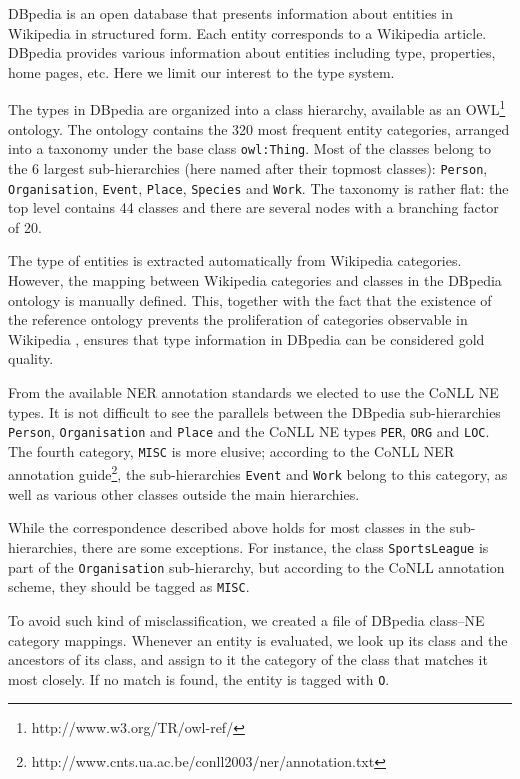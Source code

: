 \documentclass[11pt]{article}
\begin{document}
DBpedia is an open database that presents information about entities in Wikipedia in structured form. Each entity corresponds to a Wikipedia article. DBpedia provides various information about entities including type, properties, home pages, etc. Here we limit our interest to the type system.

The types in DBpedia are organized into a class hierarchy, available as an OWL\footnote{http://www.w3.org/TR/owl-ref/} ontology. The ontology contains the 320 most frequent entity categories, arranged into a taxonomy under the base class \texttt{owl:Thing}. Most of the classes belong to the 6 largest sub-hierarchies (here named after their topmost classes): \texttt{Person}, \texttt{Organisation}, \texttt{Event}, \texttt{Place}, \texttt{Species} and \texttt{Work}. The taxonomy is rather flat: the top level contains 44 classes and there are several nodes with a branching factor of 20.

The type of entities is extracted automatically from Wikipedia categories. However, the mapping between Wikipedia categories and classes in the DBpedia ontology is manually defined. This, together with the fact that the existence of the reference ontology prevents the proliferation of categories observable in Wikipedia \cite{Bizer:09}, ensures that type information in DBpedia can be considered gold quality.

From the available NER annotation standards we elected to use the CoNLL \cite{Tjong:03} NE types. It is not difficult to see the parallels between the DBpedia sub-hierarchies \texttt{Person}, \texttt{Organisation} and \texttt{Place} and the CoNLL NE types \texttt{PER}, \texttt{ORG} and \texttt{LOC}. The fourth category, \texttt{MISC} is more elusive; according to the CoNLL NER annotation guide\footnote{http://www.cnts.ua.ac.be/conll2003/ner/annotation.txt}, the sub-hierarchies \texttt{Event} and \texttt{Work} belong to this category, as well as various other classes outside the main hierarchies. 

While the correspondence described above holds for most classes in the sub-hierarchies, there are some exceptions. For instance, the class \texttt{SportsLeague} is part of the \texttt{Organisation} sub-hierarchy, but according to the CoNLL annotation scheme, they should be tagged as \texttt{MISC}. 

To avoid such kind of misclassification, 
we created a file of DBpedia class--NE category mappings. Whenever an entity is evaluated, we look up its class and the ancestors of its class, and assign to it the category of the class that matches it most closely. If no match is found, the entity is tagged with \texttt{O}. 
\end{document}
